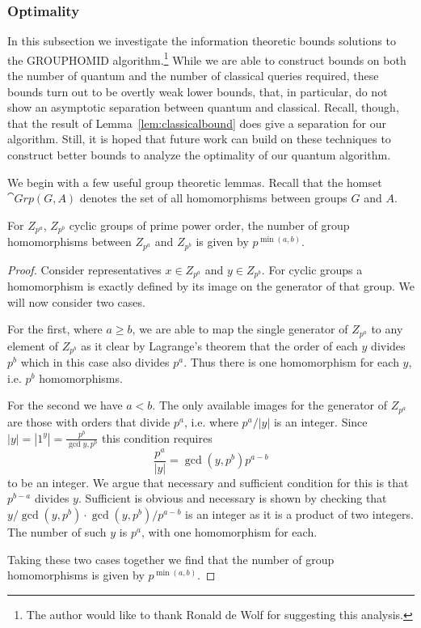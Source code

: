 \subsubsection*{Optimality}
In this subsection we investigate the information theoretic bounds solutions to the GROUPHOMID algorithm.\footnote{The author would like to thank Ronald de Wolf for suggesting this analysis.}  While we are able to construct bounds on both the number of quantum and the number of classical queries required, these bounds turn out to be overtly weak lower bounds, that, in particular, do not show an asymptotic separation between quantum and classical.  Recall, though, that the result of Lemma~\ref{lem:classicalbound} does give a separation for our algorithm. Still, it is hoped that future work can build on these techniques to construct better bounds to analyze the optimality of our quantum algorithm.

We begin with a few useful group theoretic lemmas. Recall that the homset $\cat{Grp}(G,A)$ denotes the set of all homomorphisms between groups $G$ and $A$.

\begin{lemma}
\label{lem:ppowtoppow}
For $Z_{p^a}$, $Z_{p^b}$ cyclic groups of prime power order, the number of group homomorphisms between $Z_{p^a}$ and $Z_{p^b}$ is given by $p^{\min(a,b)}$.
\end{lemma}
\begin{proof} Consider representatives $x\in Z_{p^a}$ and $y\in Z_{p^b}$. For cyclic groups a homomorphism is exactly defined by its image on the generator of that group. We will now consider two cases.  

For the first, where $a\ge b$, we are able to map the single generator of $Z_{p^a}$ to any element of $Z_{p^b}$ as it clear by Lagrange's theorem that the order of each $y$ divides $p^b$ which in this case also divides $p^a$.  Thus there is one homomorphism for each $y$, i.e. $p^b$ homomorphisms.

For the second we have $a < b$. The only available images for the generator of $Z_{p^a}$ are those with orders that divide $p^a$, i.e. where $p^a/|y|$ is an integer. Since $|y| = |1^y| = \frac{p^b}{\gcd{y,p^b}}$ this condition requires
\[ \frac{p^a}{|y|} = \gcd(y,p^b)p^{a-b} \]
to be an integer. We argue that necessary and sufficient condition for this is that $p^{b-a}$ divides $y$.  Sufficient is obvious and necessary is shown by checking that $y/\gcd(y,p^b)\cdot\gcd(y,p^b)/p^{a-b}$ is an integer as it is a product of two integers. The number of such $y$ is $p^a$, with one homomorphism for each.

Taking these two cases together we find that the number of group homomorphisms is given by $p^{\min(a,b)}$.
\end{proof}

